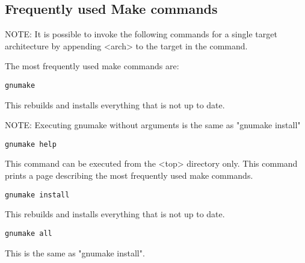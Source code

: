 \subsection{Frequently used Make commands }

NOTE: It is possible to invoke the following commands for a single target architecture by appending \textless{}arch\textgreater{} to the target 
in the command. 

The most frequently used make commands are:

\begin{verbatim}gnumake
\end{verbatim}\begin{description}\item This rebuilds and installs everything that is not up to date.

\item NOTE: Executing gnumake without arguments is the same as "gnumake install"

\item 

\end{description}\begin{verbatim}gnumake help
\end{verbatim}\begin{description}\item This command can be executed from the \textless{}top\textgreater{} directory only. This command prints a page describing the most 
frequently used make commands.

\item 

\end{description}\begin{verbatim}gnumake install
\end{verbatim}\begin{description}\item This rebuilds and installs everything that is not up to date.

\item 

\end{description}\begin{verbatim}gnumake all
\end{verbatim}\begin{description}\item This is the same as "gnumake install".

\item 


\end{description}

